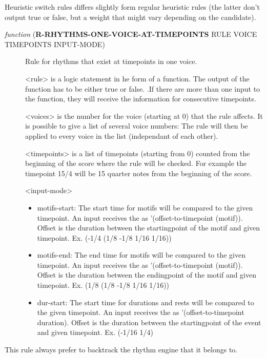 Heuristic switch rules differs slightly form regular heuristic rules (the 
latter don't output true or false, but a weight that might vary depending
on the candidate).



\begin{description}
\item[{ \emph{function} (\textbf{R-RHYTHMS-ONE-VOICE-AT-TIMEPOINTS} RULE VOICE TIMEPOINTS INPUT-MODE)}] Rule for rhythms that exist at timepoints in one voice.

<rule> is a logic statement in he form of a function. The output of the 
function has to be either true or false. .If there are more than one 
input to the function, they will receive the information for consecutive
timepoints.

<voices> is the number for the voice (starting at 0) that the rule affects. 
It is possible to give a list of several voice numbers: The rule will then 
be applied to every voice in the list (independant of each other).

<timepoints> is a list of timepoints (starting from 0) counted from the 
beginning of the score where the rule will be checked. For example
the timepoint 15/4 will be 15 quarter notes from the beginning of the 
score. 

<input-mode>              
\begin{itemize}
\item motifs-start: The start time for motifs will be compared to the given 
timepoint. An input receives the as 
'(offset-to-timepoint (motif)). Offset is the duration 
between the startingpoint of the motif and given timepoint. 
Ex. (-1/4 (1/8 -1/8 1/16 1/16))
\item motifs-end:   The end time for motifs will be compared to the given 
timepoint. An input receives the as 
'(offset-to-timepoint (motif)). Offset is the duration 
between the endingpoint of the motif and given timepoint. 
Ex. (1/8 (1/8 -1/8 1/16 1/16))
\item dur-start:    The start time for durations and rests will be compared to 
the given timepoint. An input receives the as 
'(offset-to-timepoint duration). Offset is the duration 
between the startingpoint of the event and given timepoint. 
Ex. (-1/16 1/4)
\end{itemize}
\end{description}



This rule always prefer to backtrack the rhythm engine that it belongs to.



